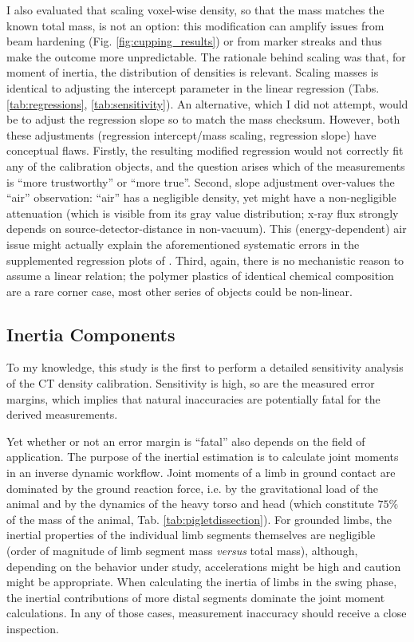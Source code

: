I also evaluated that scaling voxel-wise density, so that the mass matches the known total mass, is not an option: this modification can amplify issues from beam hardening (Fig. \ref{fig:cupping_results}) or from marker streaks and thus make the outcome more unpredictable.
The rationale behind scaling was that, for moment of inertia, the distribution of densities is relevant.
Scaling masses is identical to adjusting the intercept parameter in the linear regression (Tabs. \ref{tab:regressions}, \ref{tab:sensitivity}).
An alternative, which I did not attempt, would be to adjust the regression slope so to match the mass checksum.
However, both these adjustments (regression intercept/mass scaling, regression slope) have conceptual flaws.
Firstly, the resulting modified regression would not correctly fit any of the calibration objects, and the question arises which of the measurements is ``more trustworthy'' or ``more true''.
Second, slope adjustment over-values the ``air'' observation: ``air'' has a negligible density, yet might have a non-negligible attenuation (which is visible from its gray value distribution; x-ray flux strongly depends on source-detector-distance in non-vacuum).
This (energy-dependent) air issue might actually explain the aforementioned systematic errors in the supplemented regression plots of \citet{Durston2022}.
Third, again, there is no mechanistic reason to assume a linear relation; the polymer plastics of identical chemical composition are a rare corner case, most other series of objects could be non-linear.
\subsection{Inertia Components}
\label{sec:org1cfb588}
To my knowledge, this study is the first to perform a detailed sensitivity analysis of the CT density calibration.
Sensitivity is high, so are the measured error margins, which implies that natural inaccuracies are potentially fatal for the derived measurements.

Yet whether or not an error margin is ``fatal'' also depends on the field of application.
The purpose of the inertial estimation is to calculate joint moments in an inverse dynamic workflow.
Joint moments of a limb in ground contact are dominated by the ground reaction force, i.e. by the gravitational load of the animal and by the dynamics of the heavy torso and head (which constitute \(75 \%\) of the mass of the animal, Tab. \ref{tab:pigletdissection}).
For grounded limbs, the inertial properties of the individual limb segments themselves are negligible (order of magnitude of limb segment mass \emph{versus} total mass), although, depending on the behavior under study, accelerations might be high and caution might be appropriate.
When calculating the inertia of limbs in the swing phase, the inertial contributions of more distal segments dominate the joint moment calculations.
In any of those cases, measurement inaccuracy should receive a close inspection.


